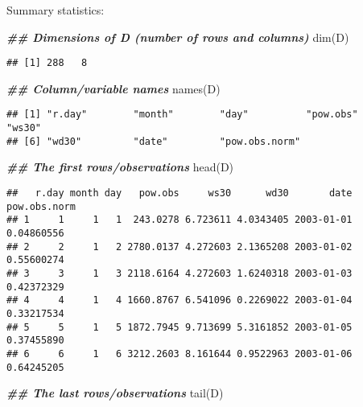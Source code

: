 \documentclass[
]{article}
\newenvironment{Shaded}{\begin{snugshade}}{\end{snugshade}}
\newcommand{\DocumentationTok}[1]{\textcolor[rgb]{0.56,0.35,0.01}{\textbf{\textit{#1}}}}
\newcommand{\FunctionTok}[1]{\textcolor[rgb]{0.00,0.00,0.00}{#1}}
\newcommand{\NormalTok}[1]{#1}
\begin{document}
Summary statistics:

\begin{Shaded}
\begin{Highlighting}[]
\DocumentationTok{\#\# Dimensions of D (number of rows and columns)}
\FunctionTok{dim}\NormalTok{(D)}
\end{Highlighting}
\end{Shaded}

\begin{verbatim}
## [1] 288   8
\end{verbatim}

\begin{Shaded}
\begin{Highlighting}[]
\DocumentationTok{\#\#  Column/variable names}
\FunctionTok{names}\NormalTok{(D)}
\end{Highlighting}
\end{Shaded}

\begin{verbatim}
## [1] "r.day"        "month"        "day"          "pow.obs"      "ws30"        
## [6] "wd30"         "date"         "pow.obs.norm"
\end{verbatim}

\begin{Shaded}
\begin{Highlighting}[]
\DocumentationTok{\#\# The first rows/observations}
\FunctionTok{head}\NormalTok{(D)}
\end{Highlighting}
\end{Shaded}

\begin{verbatim}
##   r.day month day   pow.obs     ws30      wd30       date pow.obs.norm
## 1     1     1   1  243.0278 6.723611 4.0343405 2003-01-01   0.04860556
## 2     2     1   2 2780.0137 4.272603 2.1365208 2003-01-02   0.55600274
## 3     3     1   3 2118.6164 4.272603 1.6240318 2003-01-03   0.42372329
## 4     4     1   4 1660.8767 6.541096 0.2269022 2003-01-04   0.33217534
## 5     5     1   5 1872.7945 9.713699 5.3161852 2003-01-05   0.37455890
## 6     6     1   6 3212.2603 8.161644 0.9522963 2003-01-06   0.64245205
\end{verbatim}

\begin{Shaded}
\begin{Highlighting}[]
\DocumentationTok{\#\# The last rows/observations}
\FunctionTok{tail}\NormalTok{(D)}
\end{Highlighting}
\end{Shaded}
\end{document}
